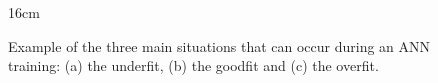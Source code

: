 \begin{figure}[hbtp]{16cm}
	\caption{Example of the three main situations that can occur during an ANN training: (a) the underfit, (b) the goodfit and (c) the overfit.}
	\centering
	\quad
	\quad

\end{figure}
